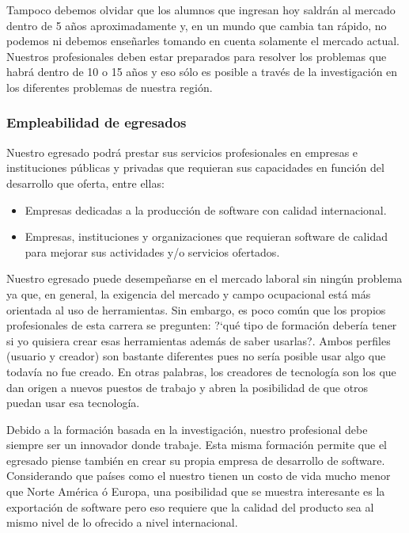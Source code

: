 Tampoco debemos olvidar que los alumnos que ingresan hoy saldrán al mercado dentro de 5 años aproximadamente y, 
en un mundo que cambia tan rápido, no podemos ni debemos enseñarles tomando en cuenta solamente el mercado actual. 
Nuestros profesionales deben estar preparados para resolver los problemas que habrá dentro de 10 o 15 años y 
eso sólo es posible a través de la investigación en los diferentes problemas de nuestra región.


\subsubsection{Empleabilidad de egresados}
Nuestro egresado podrá prestar sus servicios profesionales en empresas e instituciones públicas y privadas que requieran 
sus capacidades en función del desarrollo que oferta, entre ellas:

\begin{itemize}
\item Empresas dedicadas a la producción de software con calidad internacional.
\item Empresas, instituciones y organizaciones que requieran software de calidad para mejorar sus actividades y/o servicios ofertados.
\end{itemize}


Nuestro egresado puede desempeñarse en el mercado laboral sin ningún problema ya que, en general, la exigencia del 
mercado y campo ocupacional está más orientada al uso de herramientas. Sin embargo, es poco común que los propios 
profesionales de esta carrera se pregunten: ?`qué tipo de formación debería tener si yo quisiera crear esas herramientas además de saber usarlas?.  
Ambos perfiles (usuario y creador) son bastante diferentes pues no sería posible usar algo que todavía no fue creado. 
En otras palabras, los creadores de tecnología son los que dan origen a nuevos puestos de trabajo y abren 
la posibilidad de que otros puedan usar esa tecnología.

Debido a la formación basada en la investigación, nuestro profesional debe siempre ser un innovador donde trabaje. 
Esta misma formación permite que el egresado piense también en crear su propia empresa de desarrollo de software. 
Considerando que países como el nuestro tienen un costo de vida mucho menor que Norte América ó Europa, una 
posibilidad que se muestra interesante es la exportación de software pero eso requiere que la calidad del 
producto sea al mismo nivel de lo ofrecido a nivel internacional.

